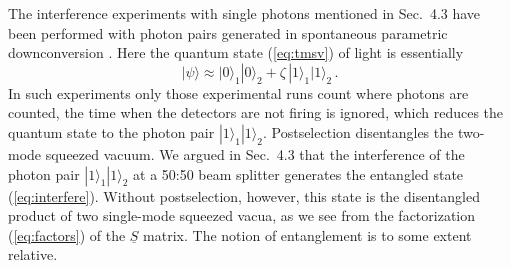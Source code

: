 \documentclass[12pt,amsmath,amssymb]{article}
\numberwithin{equation}{section}
\begin{document}
The interference experiments with single photons
mentioned in Sec.\ 4.3 have been performed with photon pairs
generated in spontaneous parametric downconversion
\cite{MandelWolf}.
Here the quantum state (\ref{eq:tmsv}) of light is essentially
\begin{equation}
|\psi\rangle \approx
|0\rangle_1 |0\rangle_2
+\zeta\,|1\rangle_1 |1\rangle_2 \,.
\end{equation}
In such experiments only those experimental runs count where
photons are counted, the time when the detectors are not firing
is ignored, which reduces the quantum state to the photon pair
$|1\rangle_1 |1\rangle_2$. Postselection disentangles the
two-mode squeezed vacuum. We argued in Sec.\ 4.3
that the interference of the photon pair
$|1\rangle_1 |1\rangle_2$ at a 50:50 beam splitter
generates the entangled state (\ref{eq:interfere}).
Without postselection, however, this state is the disentangled
product of two single-mode squeezed vacua, as we see from
the factorization (\ref{eq:factors}) of the $\underline{S}$ matrix.
The notion of entanglement is to some extent relative.
\end{document}

